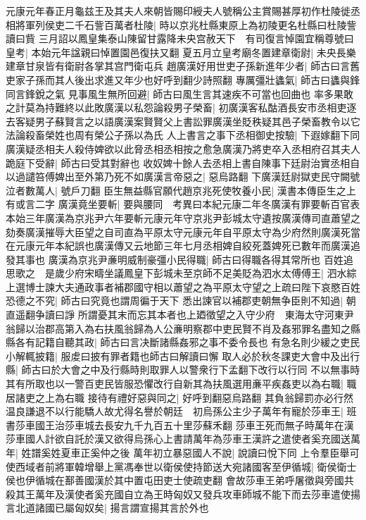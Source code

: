 元康元年春正月龜兹王及其夫人來朝皆賜印綬夫人號稱公主賞賜甚厚初作杜陵徙丞相將軍列侯吏二千石訾百萬者杜陵|{
	時以京兆杜縣東原上為初陵更名杜縣曰杜陵訾讀曰貲}
三月詔以鳳皇集泰山陳留甘露降未央宫赦天下　有司復言悼園宜稱尊號曰皇考|{
	本始元年諡親曰悼置園邑復扶又翻}
夏五月立皇考廟冬置建章衛尉|{
	未央長樂建章甘泉皆有衛尉各掌其宫門衛屯兵}
趙廣漢好用世吏子孫新進年少者|{
	師古曰言舊吏家子孫而其人後出求進又年少也好呼到翻少詩照翻}
專厲彊壯蠭氣|{
	師古曰蠭與鋒同言鋒銳之氣}
見事風生無所回避|{
	師古曰風生言其速疾不可當也回曲也}
率多果敢之計莫為持難終以此敗廣漢以私怨論殺男子榮畜|{
	初廣漢客私酤酒長安市丞相吏逐去客疑男子蘇賢言之以語廣漢案賢賢父上書訟罪廣漢坐貶秩疑其邑子榮畜教令以它法論殺畜榮姓也周有榮公子孫以為氏}
人上書言之事下丞相御史按驗|{
	下遐嫁翻下同}
廣漢疑丞相夫人殺侍婢欲以此脅丞相丞相按之愈急廣漢乃將吏卒入丞相府召其夫人跪庭下受辭|{
	師古曰受其對辭也}
收奴婢十餘人去丞相上書自陳事下廷尉治實丞相自以過譴笞傅婢出至外第乃死不如廣漢言帝惡之|{
	惡烏路翻}
下廣漢廷尉獄吏民守闕號泣者數萬人|{
	號戶刀翻}
臣生無益縣官願代趙京兆死使牧養小民|{
	漢書本傳臣生之上有或言二字}
廣漢竟坐要斬|{
	要與腰同　考異曰本紀元康二年冬廣漢有罪要斬百官表本始三年廣漢為京兆尹六年要斬元康元年守京兆尹彭城太守遺按廣漢傳司直蕭望之劾奏廣漢摧辱大臣望之自司直為平原太守元康元年自平原太守為少府然則廣漢死當在元康元年本紀誤也廣漢傳又云地節三年七月丞相婢自絞死蓋婢死已數年而廣漢追發其事也}
廣漢為京兆尹亷明威制豪彊小民得職|{
	師古曰得職各得其常所也}
百姓追思歌之　是歲少府宋疇坐議鳳皇下彭城未至京師不足美貶為泗水太傅傅王|{
	泗水綜}
上選博士諫大夫通政事者補郡國守相以蕭望之為平原太守望之上疏曰陛下哀愍百姓恐德之不究|{
	師古曰究竟也謂周徧于天下}
悉出諫官以補郡吏朝無争臣則不知過|{
	朝直遥翻争讀曰諍}
所謂憂其末而忘其本者也上廼徵望之入守少府　東海太守河東尹翁歸以治郡高第入為右扶風翁歸為人公亷明察郡中吏民賢不肖及姦邪罪名盡知之縣縣各有記籍自聽其政|{
	師古曰言决斷諸縣姦邪之事不委令長也}
有急名則少緩之吏民小解輒披籍|{
	服䖍曰披有罪者籍也師古曰解讀曰懈}
取人必於秋冬課吏大會中及出行縣|{
	師古曰於大會之中及行縣時則取罪人以警衆行下孟翻下改行以行同}
不以無事時其有所取也以一警百吏民皆服恐懼改行自新其為扶風選用亷平疾姦吏以為右職|{
	職居諸吏之上為右職}
接待有禮好惡與同之|{
	好呼到翻惡烏路翻}
其負翁歸罰亦必行然温良謙退不以行能驕人故尤得名譽於朝廷　初烏孫公主少子萬年有寵於莎車王|{
	班書莎車國王治莎車城去長安九千九百五十里莎蘇禾翻}
莎車王死而無子時萬年在漢莎車國人計欲自託於漢又欲得烏孫心上書請萬年為莎車王漢許之遣使者奚充國送萬年|{
	姓譜奚姓夏車正奚仲之後}
萬年初立暴惡國人不說|{
	說讀曰悅下同}
上令羣臣舉可使西域者前將軍韓增舉上黨馮奉世以衛侯使持節送大宛諸國客至伊循城|{
	衛侯衛士侯也伊循城在鄯善國漢於其中置屯田吏士使疏吏翻}
會故莎車王弟呼屠徵與旁國共殺其王萬年及漢使者奚充國自立為王時匈奴又發兵攻車師城不能下而去莎車遣使揚言北道諸國已屬匈奴矣|{
	揚言謂宣揚其言於外也}
